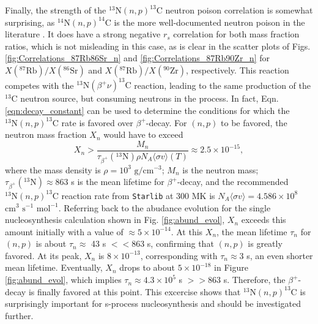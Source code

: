 Finally, the strength of the $^{13}\mathrm{N}(n,p)^{13}\mathrm{C}$ neutron poison correlation is somewhat surprising, as $^{14}\mathrm{N}(n,p)^{14}\mathrm{C}$ is the more well-documented neutron poison in the literature \cite{Habing2004}. It does have a strong negative $r_{s}$ correlation for both mass fraction ratios, which is not misleading in this case, as is clear in the scatter plots of Figs. \ref{fig:Correlations_87Rb86Sr_n} and \ref{fig:Correlations_87Rb90Zr_n} for $X(^{87}\mathrm{Rb})/X(^{86}\mathrm{Sr})$ and $X(^{87}\mathrm{Rb})/X(^{90}\mathrm{Zr})$, respectively. This reaction competes with the $^{13}\mathrm{N}(\beta^{+}\nu)^{13}\mathrm{C}$ reaction, leading to the same production of the $^{13}$C neutron source, but consuming neutrons in the process. In fact, Eqn. \ref{eqn:decay_constant} can be used to determine the conditions for which the $^{13}\mathrm{N}(n,p)^{13}\mathrm{C}$ rate is favored over $\beta^{+}$-decay. For $(n,p)$ to be favored, the neutron mass fraction $X_{n}$ would have to exceed
\begin{equation} \label{eqn:n_mass_frac_condition}
X_{n} > \frac{M_{n}}{\tau_{\beta^{+}}(^{13}\mathrm{N}) \rho N_{A} \langle \sigma v \rangle(T)} \approx 2.5 \times 10^{-15},
\end{equation}
where the mass density is $\rho = 10^{3}$ $\mathrm{g}/\mathrm{cm}^{-3}$; $M_{n}$ is the neutron mass; $\tau_{\beta^{+}}(^{13}\mathrm{N}) \approx 863$ s \cite{Audi2003} is the mean lifetime for $\beta^{+}$-decay, and the recommended $^{13}\mathrm{N}(n,p)^{13}\mathrm{C}$ reaction rate from \texttt{Starlib} at 300 MK is $N_{A} \langle \sigma v \rangle = 4.586 \times 10^{8}$ $\mathrm{cm}^{3}$ $\mathrm{s}^{-1}$ $\mathrm{mol}^{-1}$. Referring back to the abudance evolution for the single nucleosynthesis calculation shown in Fig. \ref{fig:abund_evol}, $X_{n}$ exceeds this amount initially with a value of $\approx 5 \times 10^{-14}$. At this $X_{n}$, the mean lifetime $\tau_{n}$ for $(n,p)$ is about $\tau_{n} \approx$ 43 s $<< 863$ s, confirming that $(n,p)$ is greatly favored. At its peak, $X_{n}$ is $8 \times 10^{-13}$, corresponding with $\tau_{n} \approx 3$ s, an even shorter mean lifetime. Eventually, $X_{n}$ drops to about $5 \times 10^{-18}$ in Figure \ref{fig:abund_evol}, which implies $\tau_{n} \approx 4.3 \times 10^{5}$ s $>> 863$ s. Therefore, the $\beta^{+}$-decay is finally favored at this point. This excercise shows that $^{13}\mathrm{N}(n,p)^{13}\mathrm{C}$ is surprisingly important for s-process nucleosynthesis and should be investigated further.

